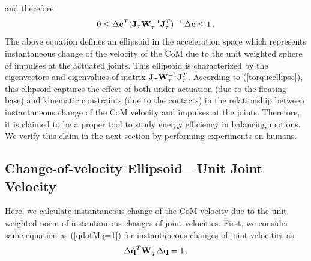 %
and therefore
%
\begin{equation}
  0 \leq \Delta \dot{\mathbf{c}}^T (\mathbf{J}_\tau \mathbf{W}_\tau^{-1} \mathbf{J}_\tau^T)^{-1} \, \Delta
  \dot{\mathbf{c}} \leq 1 \, .
  \label{torqueellipse}
\end{equation}
%
The above equation defines an ellipsoid in the acceleration space which
represents instantaneous change of the velocity of the CoM due to the unit
weighted sphere of impulses at the actuated joints.  This ellipsoid is
characterized by the eigenvectors and eigenvalues of matrix $\mathbf{J}_\tau
\mathbf{W}_\tau^{-1} \mathbf{J}_\tau^T$.  According to (\ref{torqueellipse}), this ellipsoid
captures the effect of both under-actuation (due to the floating base) and
kinematic constraints (due to the contacts) in the relationship between
instantaneous change of the CoM velocity and impulses at the joints.
Therefore, it is claimed to be a proper tool to study energy efficiency in
balancing motions.  We verify this claim in the next section by performing
experiments on humans.


\subsection{Change-of-velocity Ellipsoid---Unit Joint Velocity}

Here, we calculate instantaneous change of the CoM velocity due to the unit
weighted norm of instantaneous changes of joint velocities.  First, we
consider same equation as (\ref{qdotMq=1}) for instantaneous changes of joint
velocities as
%
\begin{equation}
  \Delta \dot{\mathbf{q}}^T \mathbf{W}_q \, \Delta \dot{\mathbf{q}} = 1 \, .
  \label{Deltaqdot=1}
\end{equation}
%

